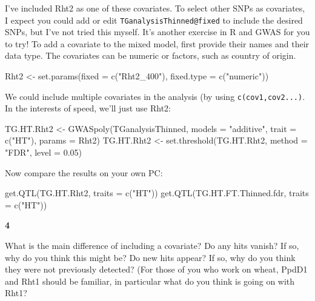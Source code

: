 \documentclass[
]{book}
\makeatletter
\newenvironment{Shaded}{\begin{snugshade}}{\end{snugshade}}
\newcommand{\AttributeTok}[1]{\textcolor[rgb]{0.77,0.63,0.00}{#1}}
\newcommand{\FloatTok}[1]{\textcolor[rgb]{0.00,0.00,0.81}{#1}}
\newcommand{\FunctionTok}[1]{\textcolor[rgb]{0.00,0.00,0.00}{#1}}
\newcommand{\NormalTok}[1]{#1}
\newcommand{\OtherTok}[1]{\textcolor[rgb]{0.56,0.35,0.01}{#1}}
\newcommand{\StringTok}[1]{\textcolor[rgb]{0.31,0.60,0.02}{#1}}
\newenvironment{kframe}{%
\medskip{}
\setlength{\fboxsep}{.8em}
 \def\at@end@of@kframe{}%
 \ifinner\ifhmode%
  \def\at@end@of@kframe{\end{minipage}}%
  \begin{minipage}{\columnwidth}%
 \fi\fi%
 \def\FrameCommand##1{\hskip\@totalleftmargin \hskip-\fboxsep
 \colorbox{shadecolor}{##1}\hskip-\fboxsep
     \hskip-\linewidth \hskip-\@totalleftmargin \hskip\columnwidth}%
 \MakeFramed {\advance\hsize-\width
   \@totalleftmargin\z@ \linewidth\hsize
   \@setminipage}}%
 {\par\unskip\endMakeFramed%
 \at@end@of@kframe}
\newenvironment{rmdblock}[1]
  {
  \begin{itemize}
  \renewcommand{\labelitemi}{
    \raisebox{-.7\height}[0pt][0pt]{
      {\setkeys{Gin}{width=3em,keepaspectratio}\texttt{[image: images/\#1]}}
    }
  }
  \setlength{\fboxsep}{1em}
  \begin{kframe}
  \item
  }
  {
  \end{kframe}
  \end{itemize}
  }
\newenvironment{rmdquiz}
  {\begin{rmdblock}{quiz}}
  {\end{rmdblock}}
\makeatother
\begin{document}
I've included Rht2 as one of these covariates. To select other SNPs as covariates, I expect you could add or edit \texttt{TGanalysisThinned@fixed} to include the desired SNPs, but I've not tried this myself. It's another exercise in R and GWAS for you to try! To add a covariate to the mixed model, first provide their names and their data type. The covariates can be numeric or factors, such as country of origin.

\begin{Shaded}
\begin{Highlighting}[]
\NormalTok{Rht2 }\OtherTok{\textless{}{-}} \FunctionTok{set.params}\NormalTok{(}\AttributeTok{fixed =} \FunctionTok{c}\NormalTok{(}\StringTok{"Rht2\_400"}\NormalTok{), }\AttributeTok{fixed.type =} \FunctionTok{c}\NormalTok{(}\StringTok{"numeric"}\NormalTok{))}
\end{Highlighting}
\end{Shaded}

We could include multiple covariates in the analysis (by using \texttt{c(cov1,cov2...)}. In the interests of speed, we'll just use Rht2:

\begin{Shaded}
\begin{Highlighting}[]
\NormalTok{TG.HT.Rht2 }\OtherTok{\textless{}{-}} \FunctionTok{GWASpoly}\NormalTok{(TGanalysisThinned, }\AttributeTok{models =} \StringTok{"additive"}\NormalTok{, }
    \AttributeTok{trait =} \FunctionTok{c}\NormalTok{(}\StringTok{"HT"}\NormalTok{), }\AttributeTok{params =}\NormalTok{ Rht2)}
\NormalTok{TG.HT.Rht2 }\OtherTok{\textless{}{-}} \FunctionTok{set.threshold}\NormalTok{(TG.HT.Rht2, }\AttributeTok{method =} \StringTok{"FDR"}\NormalTok{, }\AttributeTok{level =} \FloatTok{0.05}\NormalTok{)}
\end{Highlighting}
\end{Shaded}

Now compare the results on your own PC:

\begin{Shaded}
\begin{Highlighting}[]
\FunctionTok{get.QTL}\NormalTok{(TG.HT.Rht2, }\AttributeTok{traits =} \FunctionTok{c}\NormalTok{(}\StringTok{"HT"}\NormalTok{))}
\FunctionTok{get.QTL}\NormalTok{(TG.HT.FT.Thinned.fdr, }\AttributeTok{traits =} \FunctionTok{c}\NormalTok{(}\StringTok{"HT"}\NormalTok{))}
\end{Highlighting}
\end{Shaded}

\begin{rmdquiz}
\textbf{4}

What is the main difference of including a covariate? Do any hits vanish? If so, why do you think this might be? Do new hits appear? If so, why do you think they were not previously detected? (For those of you who work on wheat, PpdD1 and Rht1 should be familiar, in particular what do you think is going on with Rht1?
\end{rmdquiz}
\end{document}
